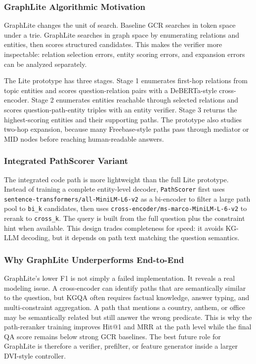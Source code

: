 \documentclass[10pt,twocolumn]{article}
\newcommand{\code}[1]{\texttt{#1}}
\begin{document}
\subsubsection{GraphLite Algorithmic Motivation}
GraphLite changes the unit of search. Baseline GCR searches in token space under a trie. GraphLite searches in graph space by enumerating relations and entities, then scores structured candidates. This makes the verifier more inspectable: relation selection errors, entity scoring errors, and expansion errors can be analyzed separately.

The Lite prototype has three stages. Stage 1 enumerates first-hop relations from topic entities and scores question-relation pairs with a DeBERTa-style cross-encoder. Stage 2 enumerates entities reachable through selected relations and scores question-path-entity triples with an entity verifier. Stage 3 returns the highest-scoring entities and their supporting paths. The prototype also studies two-hop expansion, because many Freebase-style paths pass through mediator or MID nodes before reaching human-readable answers.

\subsubsection{Integrated PathScorer Variant}
The integrated code path is more lightweight than the full Lite prototype. Instead of training a complete entity-level decoder, \code{PathScorer} first uses \code{sentence-transformers/all-MiniLM-L6-v2} as a bi-encoder to filter a large path pool to \code{bi\_k} candidates, then uses \code{cross-encoder/ms-marco-MiniLM-L-6-v2} to rerank to \code{cross\_k}. The query is built from the full question plus the constraint hint when available. This design trades completeness for speed: it avoids KG-LLM decoding, but it depends on path text matching the question semantics.

\subsubsection{Why GraphLite Underperforms End-to-End}
GraphLite's lower F1 is not simply a failed implementation. It reveals a real modeling issue. A cross-encoder can identify paths that are semantically similar to the question, but KGQA often requires factual knowledge, answer typing, and multi-constraint aggregation. A path that mentions a country, anthem, or office may be semantically related but still answer the wrong predicate. This is why the path-reranker training improves Hit@1 and MRR at the path level while the final QA score remains below strong GCR baselines. The best future role for GraphLite is therefore a verifier, prefilter, or feature generator inside a larger DVI-style controller.
\end{document}
